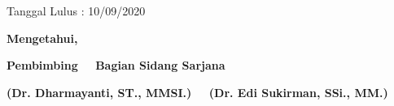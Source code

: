 \begin{center}
    \vspace{0.1cm}
    \begin{flushright}
        {Tanggal Lulus : 10/09/2020}
    \end{flushright}

    {\bf Mengetahui,}

    \vspace{0.5cm}

    {\bf Pembimbing~ \hspace{5.0cm} ~Bagian Sidang Sarjana}%

    \vspace{2cm}

    {\bf(Dr. Dharmayanti, ST., MMSI.)~ \hfill ~(Dr. Edi Sukirman, SSi., MM.)}%


\end{center}
